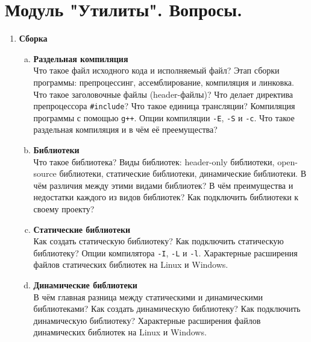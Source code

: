 \documentclass{article}
\begin{document}

\section*{Модуль "Утилиты". Вопросы.}
\begin{enumerate}

\item \textbf{Сборка}
\begin{enumerate}[a.]
\item \textbf{Раздельная компиляция}\\
Что такое файл исходного кода и исполняемый файл? Этап сборки программы: препроцессинг, ассемблирование, компиляция и линковка. Что такое заголовочные файлы (header-файлы)? Что делает директива препроцессора \texttt{\#include}? Что такое единица трансляции? Компиляция программы с помощью \texttt{g++}. Опции компиляции \texttt{-E}, \texttt{-S} и \texttt{-c}. Что такое раздельная компиляция и в чём её преемущества?


\item \textbf{Библиотеки}\\
Что такое библиотека? Виды библиотек: header-only библиотеки, open-source библиотеки, статические библиотеки, динамические библиотеки. В чём различия между этими видами библиотек? В чём преимущества и недостатки каждого из видов библиотек? Как подключить библиотеки к своему проекту? 

\item \textbf{Статические библиотеки}\\
Как создать статическую библиотеку? Как подключить статическую библиотеку? Опции компилятора \texttt{-I}, \texttt{-L} и \texttt{-l}. Характерные расширения файлов статических библиотек на Linux и Windows. 

\item \textbf{Динамические библиотеки}\\
В чём главная разница между статическими и динамическими библиотеками? Как создать динамическую библиотеку? Как подключить динамическую библиотеку? Характерные расширения файлов динамических библиотек на Linux и Windows. 


\end{enumerate}
\end{enumerate}
\end{document}
